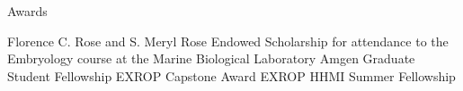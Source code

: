 \begin{rubric}{Awards}

\entry*[2018]
  Florence C. Rose and S. Meryl Rose Endowed Scholarship for attendance to the
  Embryology course at the Marine Biological Laboratory
\entry*[2014]
  Amgen Graduate Student Fellowship
\entry*[2012]
  EXROP Capstone Award
\entry*[2011]
  EXROP HHMI Summer Fellowship

\end{rubric}

